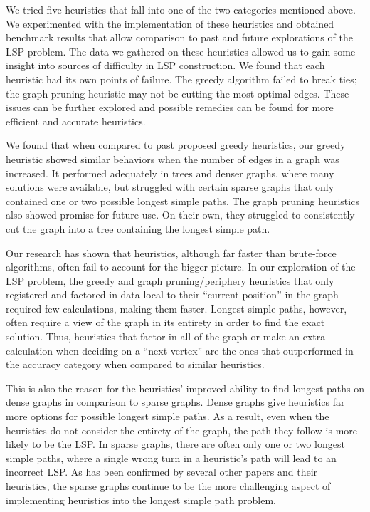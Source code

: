 \documentclass[twocolumn,showpacs,%
  nofootinbib,aps,superscriptaddress,%
  eqsecnum,prd,notitlepage,showkeys,11pt]{article}
\begin{document}
We tried five heuristics that fall into one of the two categories mentioned above. We experimented with the implementation of these heuristics and obtained benchmark results that allow comparison to past and future explorations of the LSP problem. The data we gathered on these heuristics allowed us to gain some insight into sources of difficulty in LSP construction. We found that each heuristic had its own points of failure. The greedy algorithm failed to break ties; the graph pruning heuristic may not be cutting the most optimal edges. These issues can be further explored and possible remedies can be found for more efficient and accurate heuristics.

We found that when compared to past proposed greedy heuristics, our greedy heuristic showed similar behaviors when the number of edges in a graph was increased. It performed adequately in trees and denser graphs, where many solutions were available, but struggled with certain sparse graphs that only contained one or two possible longest simple paths. The graph pruning heuristics also showed promise for future use. On their own, they struggled to consistently cut the graph into a tree containing the longest simple path. 

Our research has shown that heuristics, although far faster than brute-force algorithms, often fail to account for the bigger picture. In our exploration of the LSP problem, the greedy and graph pruning/periphery heuristics that only registered and factored in data local to their ``current position'' in the graph required few calculations, making them faster. Longest simple paths, however, often require a view of the graph in its entirety in order to find the exact solution. Thus, heuristics that factor in all of the graph or make an extra calculation when deciding on a ``next vertex'' are the ones that outperformed in the accuracy category when compared to similar heuristics.

This is also the reason for the heuristics' improved ability to find longest paths on dense graphs in comparison to sparse graphs. Dense graphs give heuristics far more options for possible longest simple paths. As a result, even when the heuristics do not consider the entirety of the graph, the path they follow is more likely to be the LSP. In sparse graphs, there are often only one or two longest simple paths, where a single wrong turn in a heuristic's path will lead to an incorrect LSP. As has been confirmed by several other papers and their heuristics, the sparse graphs continue to be the more challenging aspect of implementing heuristics into the longest simple path problem.
\end{document}
